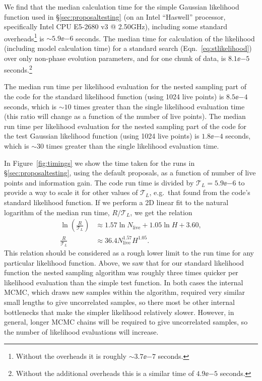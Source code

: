 We find that the median calculation time for the simple Gaussian likelihood function used in \S\ref{sec:proposaltesting} (on an Intel ``Haswell'' processor,
specifically Intel CPU E5-2680 v3 @ 2.50GHz), including some standard overheads\footnote{Without the overheads it is roughly $\sim 3.7\ee{-7}$ seconds.} is 
$\sim 5.9\ee{-6}$ seconds. The median time for calculation of the likelihood (including model calculation time) for a standard search (Eqn.~\ref{eq:stlikelihood})
over only non-phase evolution parameters, and for one chunk of data, is $8.1\ee{-5}$ seconds.\footnote{Without the additional overheads this is a similar time of
$4.9\ee{-5}$ seconds.}

The median run time per likelihood evaluation for the nested sampling part of the code for the standard likelihood function (using 1024 live points) 
is $8.5\ee{-4}$ seconds, which is $\sim 10$ times greater than the single likelihood evaluation time (this ratio will change as a function of the number
of live points). The median run time per likelihood evaluation for the nested sampling part of the code for the test Gaussian likelihood function
(using 1024 live points) is $1.8\ee{-4}$ seconds, which is $\sim 30$ times greater than the single likelihood evaluation time.

In Figure~\ref{fig:timings} we show the time taken for the runs in \S\ref{sec:proposaltesting},
using the default proposals, as a function of number of live points and information gain. The code run time is divided by $\mathcal{T}_{L}= 5.9\ee{-6}$ to
provide a way to scale it for other values of $\mathcal{T}_{L}$, e.g.\ that found from the code's standard likelihood function. If we perform a 2D linear
fit to the natural logarithm of the median run time, $R/\mathcal{T}_L$, we get the relation
\begin{align}\label{eq:runtime}
 \ln{\left(\frac{R}{\mathcal{T}_L}\right)} &\approx 1.57 \ln{N_{\text{live}}} + 1.05 \ln{H} + 3.60, \\
 \frac{R}{\mathcal{T}_L} &\approx 36.4 N_{\text{live}}^{1.57} H^{1.05}.
\end{align}
This relation should be considered as a rough lower limit to the run time for any particular likelihood function. Above, we saw that for our standard likelihood
function the nested sampling algorithm was roughly three times quicker per likelihood evaluation than the simple test function. In both cases the internal MCMC, which
draws new samples within the algorithm, required very similar small lengths to give uncorrelated samples, so there most be other internal bottlenecks that make the
simpler likelihood relatively slower. However, in general, longer MCMC chains will be required to give uncorrelated samples, so the number of likelihood evaluations
will increase.

